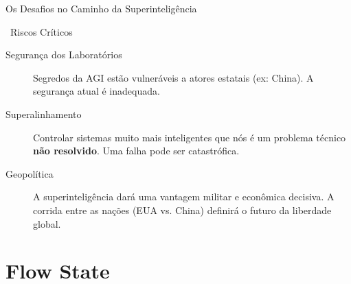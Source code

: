\documentclass[aspectratio=169,12pt]{beamer}
\begin{document}
\begin{frame}{Os Desafios no Caminho da Superinteligência}
    \begin{alertblock}{\faExclamationTriangle\, Riscos Críticos}
        \begin{description}
            \item[\textcolor{danger}{\faLock} Segurança dos Laboratórios]
            Segredos da AGI estão vulneráveis a atores estatais (ex: China). A segurança atual é inadequada.
            
            \item[\textcolor{warning}{\faCogs} Superalinhamento]
            Controlar sistemas muito mais inteligentes que nós é um problema técnico \textbf{não resolvido}. Uma falha pode ser catastrófica.
            
            \item[\textcolor{accent}{\faGlobe} Geopolítica]
            A superinteligência dará uma vantagem militar e econômica decisiva. A corrida entre as nações (EUA vs. China) definirá o futuro da liberdade global.
        \end{description}
    \end{alertblock}
\end{frame}
\section{ Flow State}
\end{document}
